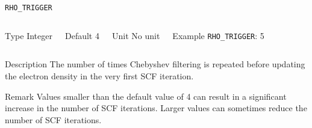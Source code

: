 \documentclass[xcolor=dvipsnames,t]{beamer}
\begin{document}
\begin{frame}[allowframebreaks]{\texttt{RHO\_TRIGGER}} \label{RHO_TRIGGER}
\vspace*{-12pt}
\begin{columns}
\begin{block}{Type}
Integer
\end{block}

\begin{block}{Default}
4
\end{block}

\begin{block}{Unit}
No unit
\end{block}

\begin{block}{Example}
\texttt{RHO\_TRIGGER}: 5
\end{block}
\end{columns}

\begin{block}{Description}
The number of times Chebyshev filtering is repeated before updating the electron density in the very first SCF iteration.
\end{block}

\begin{block}{Remark}
Values smaller than the default value of 4 can result in a significant increase in the number of SCF
iterations. Larger values can sometimes reduce the number of SCF iterations. 
\end{block}

\end{frame}
\end{document}

